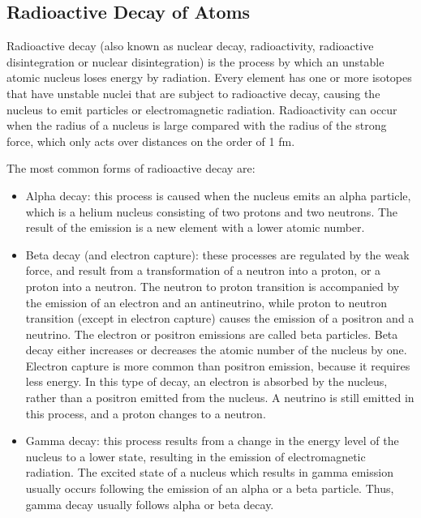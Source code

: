 \hypertarget{radioactive-decay-of-atoms}{%
\subsection{Radioactive Decay of Atoms}\label{radioactive-decay-of-atoms}}

Radioactive decay (also known as nuclear decay, radioactivity,
radioactive disintegration or nuclear disintegration) is the process by
which an unstable atomic nucleus loses energy by radiation. Every
element has one or more isotopes that have unstable nuclei that are
subject to radioactive decay, causing the nucleus to emit particles or
electromagnetic radiation. Radioactivity can occur when the radius of a
nucleus is large compared with the radius of the strong force, which
only acts over distances on the order of 1 fm.

The most common forms of radioactive decay are:

\begin{itemize}
\tightlist
\item
  Alpha decay: this process is caused when the nucleus emits an alpha
  particle, which is a helium nucleus consisting of two protons and two
  neutrons. The result of the emission is a new element with a lower
  atomic number.
\item
  Beta decay (and electron capture): these processes are regulated by
  the weak force, and result from a transformation of a neutron into a
  proton, or a proton into a neutron. The neutron to proton transition
  is accompanied by the emission of an electron and an antineutrino,
  while proton to neutron transition (except in electron capture) causes
  the emission of a positron and a neutrino. The electron or positron
  emissions are called beta particles. Beta decay either increases or
  decreases the atomic number of the nucleus by one. Electron capture is
  more common than positron emission, because it requires less energy.
  In this type of decay, an electron is absorbed by the nucleus, rather
  than a positron emitted from the nucleus. A neutrino is still emitted
  in this process, and a proton changes to a neutron.
\item
  Gamma decay: this process results from a change in the energy level of
  the nucleus to a lower state, resulting in the emission of
  electromagnetic radiation. The excited state of a nucleus which
  results in gamma emission usually occurs following the emission of an
  alpha or a beta particle. Thus, gamma decay usually follows alpha or
  beta decay.
\end{itemize}

